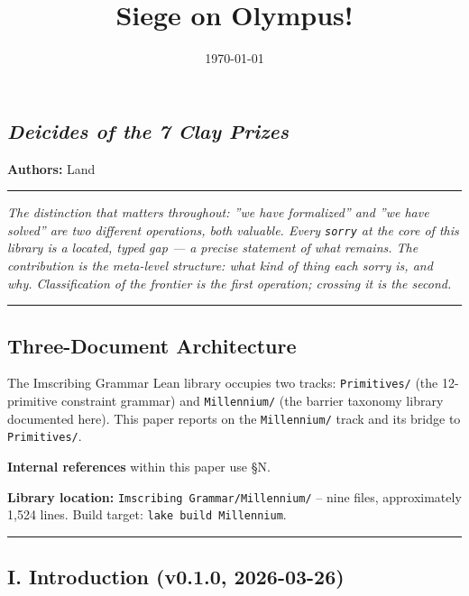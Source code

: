 \documentclass[12pt,a4paper]{article}
\newcommand{\pilcrow}{\S}
\begin{document}
\title{Siege on Olympus!}
\date{\today}

\maketitle

\subsection{\emph{Deicides of the 7 Clay Prizes}}

\textbf{Authors:} Land\otimesperator

\begin{center}
\rule{0.5\textwidth}{0.4pt}
\end{center}

\emph{The distinction that matters throughout: ''we have formalized'' and ''we have solved'' are two different operations, both valuable. Every \texttt{sorry} at the core of this library is a located, typed gap --- a precise statement of what remains. The contribution is the meta-level structure: what kind of thing each sorry is, and why. Classification of the frontier is the first operation; crossing it is the second.}

\begin{center}
\rule{0.5\textwidth}{0.4pt}
\end{center}

\subsection{Three-Document Architecture}

The Imscribing Grammar Lean library occupies two tracks: \texttt{Primitives/} (the 12-primitive constraint grammar) and \texttt{Millennium/} (the barrier taxonomy library documented here). This paper reports on the \texttt{Millennium/} track and its bridge to \texttt{Primitives/}.

\textbf{Internal references} within this paper use \pilcrow{}N.

\textbf{Library location:} \texttt{Imscribing Grammar/Millennium/}  --  nine files, approximately 1,524 lines. Build target: \texttt{lake build Millennium}.

\begin{center}
\rule{0.5\textwidth}{0.4pt}
\end{center}

\subsection{I. Introduction (v0.1.0, 2026-03-26)}
\end{document}
